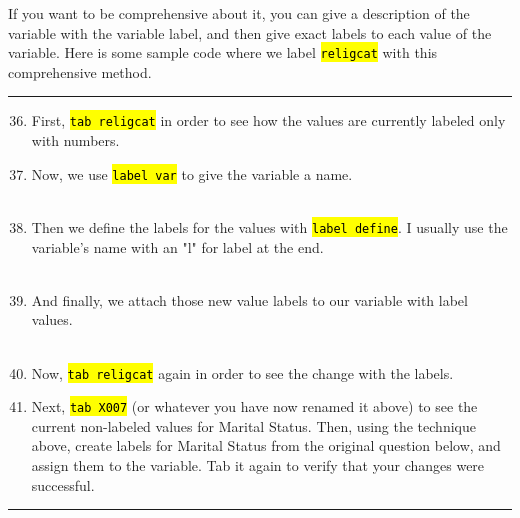 \documentclass{tufte-handout}
\begin{document}
If you want to be comprehensive about it, you can give a description of the variable with the variable label, and then give exact labels to each value of the variable. Here is some sample code where we label {\tt \hl{religcat}} with this comprehensive method.

\bigskip
\hrule
\bigskip

\begin{enumerate}[leftmargin=.5in]
\setcounter{enumi}{35}
	\item First, {\tt \hl{tab religcat}} in order to see how the values are currently labeled only with numbers.
	\item Now, we use {\tt \hl{label var}} to give the variable a name.\\
\medskip
{}\\
\medskip
	\item Then we define the labels for the values with {\tt \hl{label define}}. I usually use the variable's name with an "l" for label at the end.\\
\medskip
{}\\
	\item And finally, we attach those new value labels to our variable with label values.\\
\medskip
{}\\
\medskip
	\item Now, {\tt \hl{tab religcat}} again in order to see the change with the labels. 
	\item Next, {\tt \hl{tab X007}} (or whatever you have now renamed it above) to see the current non-labeled values for Marital Status. Then, using the technique above, create labels for Marital Status from the original question below, and assign them to the variable. Tab it again to verify that your changes were successful.
\end{enumerate}

\bigskip
\hrule
\bigskip
	
\end{document}
